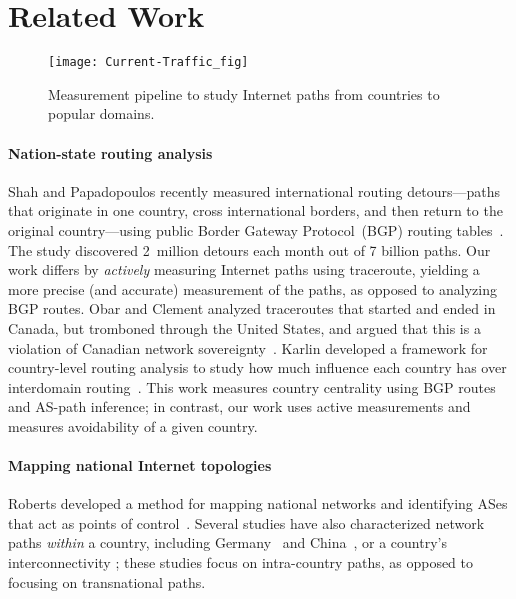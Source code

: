 \section{Related Work}
\label{related}

\begin{figure*}[t]
\centering
\texttt{[image: Current-Traffic\_fig]}
\caption{Measurement pipeline to study Internet paths from countries to
  popular domains.}
\label{fig:pipeline1}
\end{figure*}

\paragraph{Nation-state routing analysis}  Shah and
Papadopoulos recently measured international routing detours---paths that originate
in
one country, cross international borders, and then return to the
original country---using public Border Gateway Protocol~(BGP) routing tables~\cite
{shah2015characterizing}. 
The study discovered 2~million detours each month out
of 7 billion paths.
Our work differs by {\em actively}
measuring Internet paths using traceroute, yielding a more precise (and accurate) measurement of the paths, %
as opposed to analyzing BGP
routes.  Obar and Clement analyzed traceroutes
that started and ended in Canada, but tromboned through the United
States, and argued that
this is a violation of Canadian network
sovereignty~\cite{obar2012internet}. 
Karlin \ea{} developed a framework for country-level
routing analysis to study how much influence each country has over
interdomain routing~\cite{karlin2009nation}.  This work measures country
centrality using BGP routes and AS-path inference; in contrast, our work uses active 
measurements and measures avoidability of a given country. 

\paragraph{Mapping national Internet topologies}  Roberts \ea{} developed a method
for mapping national networks and identifying ASes that act as points of
control~\cite{roberts2011mapping}.   %
 Several studies have also characterized network paths {\em
within} a country, including
Germany~\cite{wahlisch2010framework,wahlisch2012exposing} and
China~\cite{zhou2007chinese}, or a country's interconnectivity %
\cite{bischof2015and,gupta2014peering,fanou2015diversity}; these studies
focus on intra-country paths, as opposed to focusing on
transnational paths.


